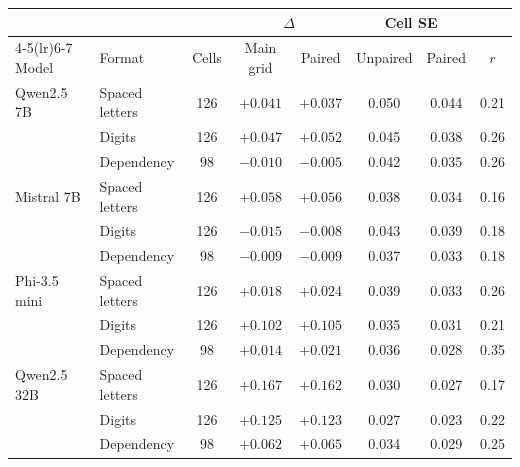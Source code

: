 \begin{tabular}{ll c cc cc c}
\toprule
& & & \multicolumn{2}{c}{$\Delta$} & \multicolumn{2}{c}{Cell SE} & \\
\cmidrule(lr){4-5}\cmidrule(lr){6-7}
Model & Format & Cells & Main grid & Paired & Unpaired & Paired & $r$ \\
\midrule
Qwen2.5 7B & Spaced letters & 126 & $+0.041$ & $+0.037$ & 0.050 & 0.044 & 0.21 \\
 & Digits & 126 & $+0.047$ & $+0.052$ & 0.045 & 0.038 & 0.26 \\
 & Dependency & 98 & $-0.010$ & $-0.005$ & 0.042 & 0.035 & 0.26 \\
Mistral 7B & Spaced letters & 126 & $+0.058$ & $+0.056$ & 0.038 & 0.034 & 0.16 \\
 & Digits & 126 & $-0.015$ & $-0.008$ & 0.043 & 0.039 & 0.18 \\
 & Dependency & 98 & $-0.009$ & $-0.009$ & 0.037 & 0.033 & 0.18 \\
Phi-3.5 mini & Spaced letters & 126 & $+0.018$ & $+0.024$ & 0.039 & 0.033 & 0.26 \\
 & Digits & 126 & $+0.102$ & $+0.105$ & 0.035 & 0.031 & 0.21 \\
 & Dependency & 98 & $+0.014$ & $+0.021$ & 0.036 & 0.028 & 0.35 \\
Qwen2.5 32B & Spaced letters & 126 & $+0.167$ & $+0.162$ & 0.030 & 0.027 & 0.17 \\
 & Digits & 126 & $+0.125$ & $+0.123$ & 0.027 & 0.023 & 0.22 \\
 & Dependency & 98 & $+0.062$ & $+0.065$ & 0.034 & 0.029 & 0.25 \\
\bottomrule
\end{tabular}
